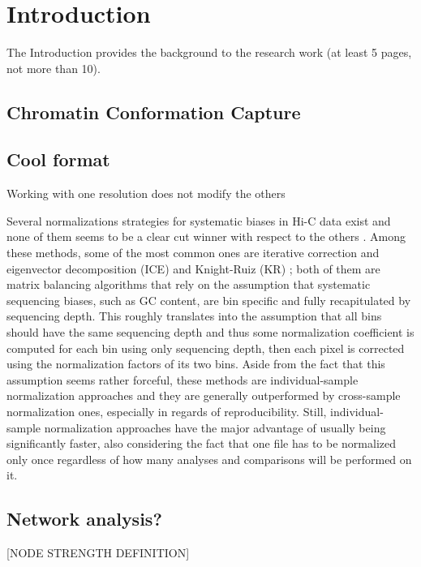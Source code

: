 \graphicspath{{chapters/02_introduction/}}
\chapter{Introduction}

The Introduction provides the background to the research work (at least 5 pages, not more
than 10).

\section{Chromatin Conformation Capture}

\section{Cool format}

Working with one resolution does not modify the others

Several normalizations strategies for systematic biases in Hi-C data exist and none of them seems to be a clear cut winner with respect to the others \cite{normalization2020}. Among these methods, some of the most common ones are iterative correction and eigenvector decomposition (ICE) \cite{ice2012} and Knight-Ruiz (KR) \cite{knightruiz2012}; both of them are matrix balancing algorithms that rely on the assumption that systematic sequencing biases, such as GC content, are bin specific and fully recapitulated by sequencing depth. This roughly translates into the assumption that all bins should have the same sequencing depth and thus some normalization coefficient is computed for each bin using only sequencing depth, then each pixel is corrected using the normalization factors of its two bins. Aside from the fact that this assumption seems rather forceful, these methods are individual-sample normalization approaches and they are generally outperformed by cross-sample normalization ones, especially in regards of reproducibility. Still, individual-sample normalization approaches have the major advantage of usually being significantly faster, also considering the fact that one file has to be normalized only once regardless of how many analyses and comparisons will be performed on it. 

\section{Network analysis?}

[NODE STRENGTH DEFINITION]